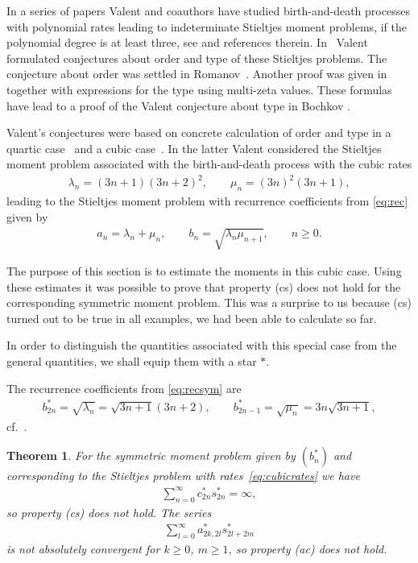 \documentclass[pdftex]{sigma}
\numberwithin{equation}{section}
\newtheorem{thm}{Theorem}[section]
\begin{document}
In a series of papers Valent and coauthors have studied birth-and-death processes with polynomial rates leading to indeterminate Stieltjes moment problems, if the polynomial degree is at least three, see \cite{Va98} and references therein. In~\cite{Va98} Valent formulated conjectures about order and type of these Stieltjes problems. The conjecture about order was settled in Romanov~\cite{Ro}. Another proof was given in~\cite{B:S3} together with expressions for the type using multi-zeta values. These formulas have lead to a proof of the Valent conjecture about type in Bochkov \cite{Bo}.

Valent's conjectures were based on concrete calculation of order and type in a quartic case~\cite{B:V} and a cubic case~\cite{Va98}. In the latter Valent considered the Stieltjes moment problem associated with the birth-and-death process with the cubic rates
\begin{gather}\label{eq:cubicrates}
\lambda_n=(3n+1)(3n+2)^2,\qquad \mu_n=(3n)^2(3n+1),
\end{gather}
leading to the Stieltjes moment problem with recurrence coefficients from \eqref{eq:rec} given by
\begin{gather*}
a_n=\lambda_n+\mu_n,\qquad b_n=\sqrt{\lambda_n\mu_{n+1}},\qquad n\ge 0.
\end{gather*}

The purpose of this section is to estimate the moments in this cubic case. Using these estimates it was possible to prove that property (cs) does not hold for the corresponding symmetric moment problem. This was a surprise to us because (cs) turned out to be true in all examples, we had been able to calculate so far.

In order to distinguish the quantities associated with this special case from the general quantities, we shall equip them with a star $*$.

The recurrence coefficients from \eqref{eq:recsym} are
\begin{gather}\label{eq:cubicsym}
b_{2n}^{*}=\sqrt{\lambda_n}=\sqrt{3n+1}(3n+2),\qquad b_{2n-1}^{*}=\sqrt{\mu_n}=3n\sqrt{3n+1},
\end{gather}
cf.~\cite[p.~343]{B:S3}.

\begin{thm}\label{thm:AHnotex} For the symmetric moment problem given by $(b_n^*)$ and corresponding to the Stieltjes problem with rates~\eqref{eq:cubicrates} we have
\begin{gather*}
\sum_{n=0}^\infty c_{2n}^*s_{2n}^*=\infty,
\end{gather*}
so property {\rm (cs)} does not hold. The series
\begin{gather*}
\sum_{l=0}^\infty a_{2k,2l}^* s_{2l+2m}^*
\end{gather*}
is not absolutely convergent for $k\ge 0$, $m\ge 1$, so property {\rm (ac)} does not hold.
\end{thm}
\end{document}
